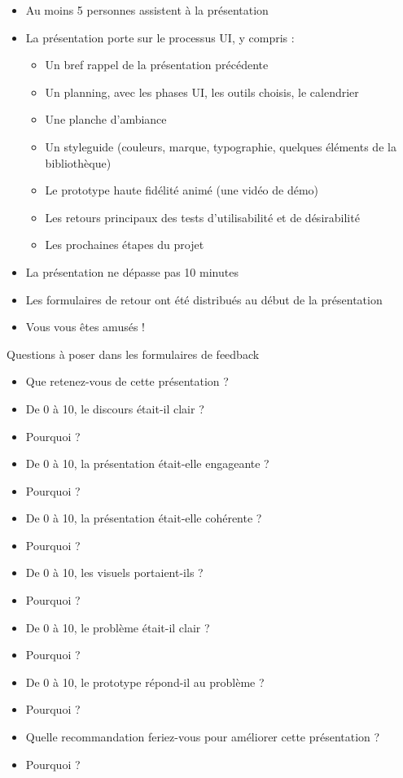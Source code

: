 \begin{itemize}
\item Au moins 5 personnes assistent à la présentation
\item La présentation porte sur le processus UI, y compris :
\begin{itemize}
\item Un bref rappel de la présentation précédente
\item Un planning, avec les phases UI, les outils choisis, le calendrier
\item Une planche d'ambiance
\item Un styleguide (couleurs, marque, typographie, quelques éléments de la bibliothèque)
\item Le prototype haute fidélité animé (une vidéo de démo)
\item Les retours principaux des tests d'utilisabilité et de désirabilité
\item Les prochaines étapes du projet
\end{itemize}
\item La présentation ne dépasse pas 10 minutes
\item Les formulaires de retour ont été distribués au début de la présentation
\item Vous vous êtes amusés !
\end{itemize}

Questions à poser dans les formulaires de feedback

\begin{itemize}
\item Que retenez-vous de cette présentation ?
\item De 0 à 10, le discours était-il clair ?
\item Pourquoi ?
\item De 0 à 10, la présentation était-elle engageante ?
\item Pourquoi ?
\item De 0 à 10, la présentation était-elle cohérente ?
\item Pourquoi ?
\item De 0 à 10, les visuels portaient-ils ?
\item Pourquoi ?
\item De 0 à 10, le problème était-il clair ?
\item Pourquoi ?
\item De 0 à 10, le prototype répond-il au problème ?
\item Pourquoi ?
\item Quelle recommandation feriez-vous pour améliorer cette présentation ?
\item Pourquoi ?
\end{itemize}

